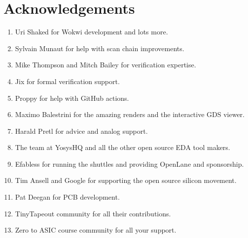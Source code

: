 \section{Acknowledgements}
\label{sec:acknowledgements}

\begin{enumerate}
    \item Uri Shaked for Wokwi development and lots more.
    \item Sylvain Munaut for help with scan chain improvements.
    \item Mike Thompson and Mitch Bailey for verification expertise.
    \item Jix for formal verification support.
    \item Proppy for help with GitHub actions.
    \item Maximo Balestrini for the amazing renders and the interactive GDS viewer.
    \item Harald Pretl for advice and analog support.
    \item The team at YosysHQ and all the other open source EDA tool makers.
    \item Efabless for running the shuttles and providing OpenLane and sponsorship.
    \item Tim Ansell and Google for supporting the open source silicon movement.
    \item Pat Deegan for PCB development.
    \item TinyTapeout community for all their contributions.
    \item Zero to ASIC course community for all your support.
\end{enumerate}
